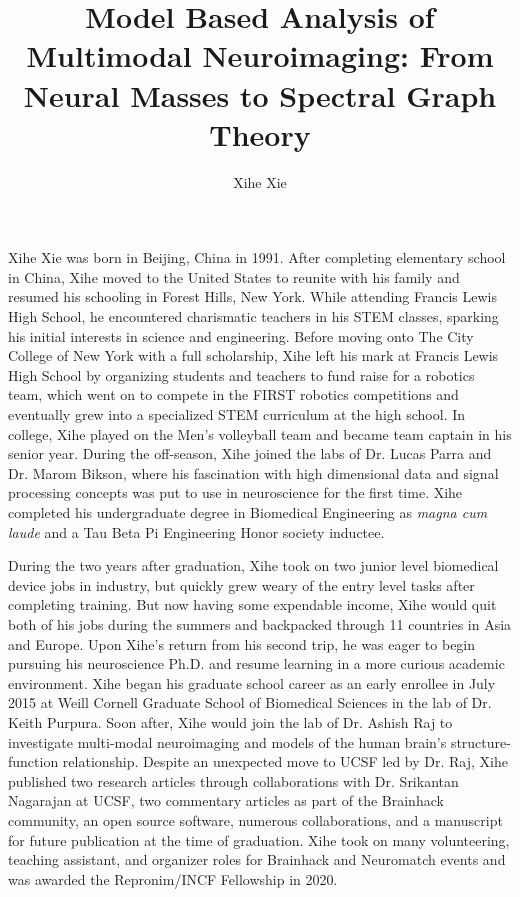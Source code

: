 \documentclass[phd,tocprelim]{cornell}
\title{Model Based Analysis of Multimodal Neuroimaging: From Neural Masses to Spectral Graph Theory}
\author {Xihe Xie}
\begin{document}
\maketitle
\makecopyright

\begin{abstract}

\end{abstract}

\begin{biosketch}
Xihe Xie was born in Beijing, China in 1991. After completing elementary school in China, Xihe moved to the United States to reunite with his family and resumed his schooling in Forest Hills, New York. While attending Francis Lewis High School, he encountered charismatic teachers in his STEM classes, sparking his initial interests in science and engineering. Before moving onto The City College of New York with a full scholarship, Xihe left his mark at Francis Lewis High School by organizing students and teachers to fund raise for a robotics team, which went on to compete in the FIRST robotics competitions and eventually grew into a specialized STEM curriculum at the high school. In college, Xihe played on the Men's volleyball team and became team captain in his senior year. During the off-season, Xihe joined the labs of Dr. Lucas Parra and Dr. Marom Bikson, where his fascination with high dimensional data and signal processing concepts was put to use in neuroscience for the first time. Xihe completed his undergraduate degree in Biomedical Engineering as \emph{magna cum laude} and a Tau Beta Pi Engineering Honor society inductee. 

During the two years after graduation, Xihe took on two junior level biomedical device jobs in industry, but quickly grew weary of the entry level tasks after completing training. But now having some expendable income, Xihe would quit both of his jobs during the summers and backpacked through 11 countries in Asia and Europe. Upon Xihe's return from his second trip, he was eager to begin pursuing his neuroscience Ph.D. and resume learning in a more curious academic environment. Xihe began his graduate school career as an early enrollee in July 2015 at Weill Cornell Graduate School of Biomedical Sciences in the lab of Dr. Keith Purpura. Soon after, Xihe would join the lab of Dr. Ashish Raj to investigate multi-modal neuroimaging and models of the human brain's structure-function relationship. Despite an unexpected move to UCSF led by Dr. Raj, Xihe published two research articles through collaborations with Dr. Srikantan Nagarajan at UCSF, two commentary articles as part of the Brainhack community, an open source software, numerous collaborations, and a manuscript for future publication at the time of graduation. Xihe took on many volunteering, teaching assistant, and organizer roles for Brainhack and Neuromatch events and was awarded the Repronim/INCF Fellowship in 2020. 


\end{biosketch}
\end{document}
